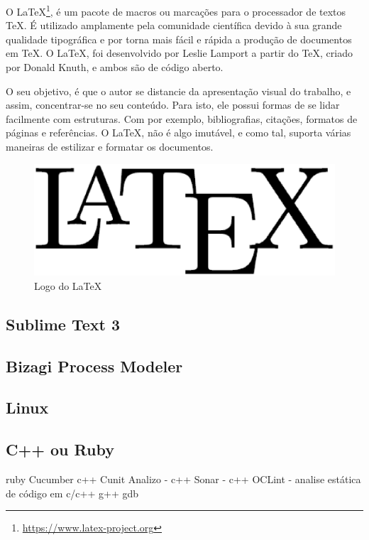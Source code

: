 O \LaTeX\footnote{\url{https://www.latex-project.org}}, é um pacote de macros ou marcações para o processador de textos \TeX. É utilizado amplamente pela comunidade científica devido à sua grande qualidade tipográfica e por torna mais fácil e rápida a produção de documentos em \TeX. O \LaTeX, foi desenvolvido por Leslie Lamport a partir do \TeX, criado por Donald Knuth, e ambos são de código aberto.

O seu objetivo, é que o autor se distancie da apresentação visual do trabalho, e assim, concentrar-se no seu conteúdo. Para isto, ele possui formas de se lidar facilmente com estruturas. Com por exemplo, bibliografias, citações, formatos de páginas e referências. O \LaTeX, não é algo imutável, e como tal, suporta várias maneiras de estilizar e formatar os documentos.

\begin{figure}[!h]
	\centering
	\includegraphics[scale=0.35]{figuras/capitulo3/latex.eps}
	\caption{Logo do \LaTeX}
	\label{latex}
\end{figure}

\subsection{Sublime Text 3}
\subsection{Bizagi Process Modeler}
\subsection{Linux}
\subsection{C++ ou Ruby}


	ruby
		Cucumber
	c++
		Cunit 
		Analizo - c++
		Sonar - c++
		OCLint - analise estática de código em c/c++
		g++
		gdb

